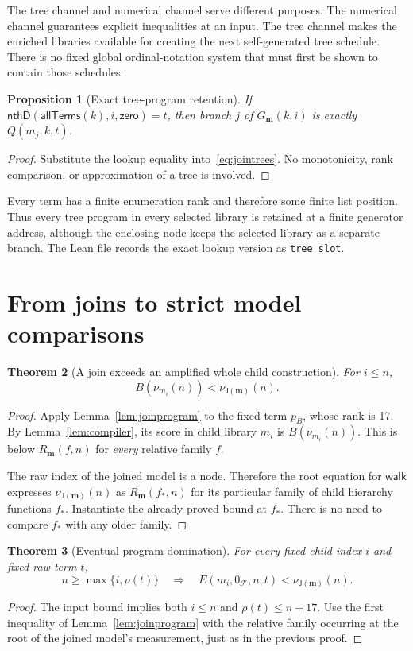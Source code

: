 \documentclass[11pt,letterpaper]{article}
\newtheorem{theorem}{Theorem}[section]
\newtheorem{proposition}[theorem]{Proposition}
\theoremstyle{definition}
\newcommand{\Fam}{\mathcal F}
\newcommand{\walk}{\mathsf{walk}}
\renewcommand{\Join}{\mathsf J}
\newcommand{\code}[1]{\nolinkurl{#1}}
\begin{document}
The tree channel and numerical channel serve different purposes. The numerical
channel guarantees explicit inequalities at an input. The tree channel makes
the enriched libraries available for creating the next self-generated tree
schedule. There is no fixed global ordinal-notation system that must first be
shown to contain those schedules.

\begin{proposition}[Exact tree-program retention]
\label{prop:tree}
If $\mathsf{nthD}(\mathsf{allTerms}(k),i,\mathsf{zero})=t$, then branch $j$ of
$G_{\mathbf m}(k,i)$ is exactly $Q(m_j,k,t)$.
\end{proposition}
\begin{proof}
Substitute the lookup equality into~\eqref{eq:jointrees}. No monotonicity,
rank comparison, or approximation of a tree is involved.
\end{proof}

Every term has a finite enumeration rank and therefore some finite list
position. Thus every tree program in every selected library is retained at a
finite generator address, although the enclosing node keeps the selected
library as a separate branch. The Lean file records the exact lookup version
as \code{tree_slot}.

\section{From joins to strict model comparisons}
\label{sec:modelbounds}

\begin{theorem}[A join exceeds an amplified whole child construction]
\label{thm:joinboost}
For $i\le n$,
\[
 B(\nu_{m_i}(n))<\nu_{\Join(\mathbf m)}(n).
\]
\end{theorem}
\begin{proof}
Apply Lemma~\ref{lem:joinprogram} to the fixed term $p_B$, whose rank is 17.
By Lemma~\ref{lem:compiler}, its score in child library $m_i$ is
$B(\nu_{m_i}(n))$. This is below $R_{\mathbf m}(f,n)$ for \emph{every} relative
family $f$.

The raw index of the joined model is a node. Therefore the root equation for
$\walk$ expresses $\nu_{\Join(\mathbf m)}(n)$ as $R_{\mathbf m}(f_*,n)$ for
its particular family of child hierarchy functions $f_*$. Instantiate the
already-proved bound at $f_*$. There is no need to compare $f_*$ with any
older family.
\end{proof}

\begin{theorem}[Eventual program domination]
\label{thm:eventual}
For every fixed child index $i$ and fixed raw term $t$,
\[
 n\ge\max\{i,\rho(t)\}
 \quad\Longrightarrow\quad
 E(m_i,0_{\Fam},n,t)<\nu_{\Join(\mathbf m)}(n).
\]
\end{theorem}
\begin{proof}
The input bound implies both $i\le n$ and $\rho(t)\le n+17$. Use the first
inequality of Lemma~\ref{lem:joinprogram} with the relative family occurring
at the root of the joined model's measurement, just as in the previous proof.
\end{proof}
\end{document}
